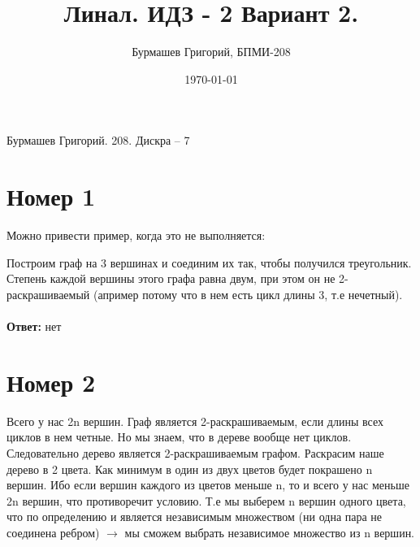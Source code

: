 \documentclass[a4paper,12pt]{article}
\author{Бурмашев Григорий, БПМИ-208}
\title{Линал. ИДЗ - 2 Вариант 2.}
\date{\today}
\begin{document}
\begin{center}
Бурмашев Григорий. 208. Дискра -- 7
\end{center}
\section*{Номер 1}
Можно привести пример, когда это не выполняется:

Построим граф на 3 вершинах и соединим их так, чтобы получился треугольник.
Степень каждой вершины этого графа равна двум, при этом он не 2-раскрашиваемый (апример потому что в нем есть цикл длины 3, т.е нечетный).
\\\\
\textbf{Ответ:} нет

\section*{Номер 2}
Всего у нас 2n вершин. Граф является 2-раскрашиваемым, если длины всех циклов в нем четные. Но мы знаем, что в дереве вообще нет циклов. Следовательно дерево является 2-раскрашиваемым графом. Раскрасим наше дерево в 2 цвета. Как минимум в один из двух цветов будет покрашено n  вершин. Ибо если вершин каждого из цветов меньше n, то и всего у нас меньше 2n вершин, что противоречит условию. Т.е мы выберем n вершин одного цвета, что по определению и является независимым множеством (ни одна пара не соединена ребром) $\rightarrow$ мы сможем выбрать независимое множество из n вершин.
\end{document}
